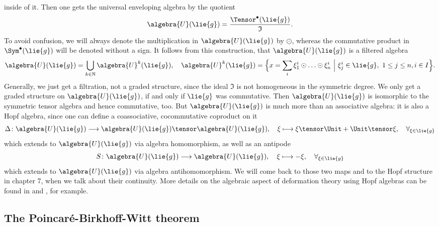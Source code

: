 inside of it. Then one gets the universal enveloping algebra by the 
quotient
\begin{equation}
	\label{Alg:UnivEnvAlg}
	\algebra{U}(\lie{g})
	=
	\frac{\Tensor^{\bullet}(\lie{g})}{\mathfrak{I}}.
\end{equation}
To avoid confusion, we will always denote the multiplication in 
$\algebra{U}(\lie{g})$ by $\odot$, whereas the commutative product in 
$\Sym^{\bullet}(\lie{g})$ will be denoted without a sign.
It follows from this construction, that $\algebra{U}(\lie{g})$ is a 
filtered algebra
\begin{equation*}
	\algebra{U}(\lie{g})
	=
	\bigcup_{k \in \mathbb{N}}
	\algebra{U}^k(\lie{g})
	, \quad
	\algebra{U}^k(\lie{g})
	= 
	\Big\lbrace
		x 
		= 
		\sum_i
		\xi_1^i \odot \ldots \odot \xi_n^i
	\ \Big| \ 
		\xi_j^i \in \lie{g}
		, \
		1 \leq j \leq n,
		i \in I
	\Big\rbrace.
\end{equation*}
Generally, we just get a filtration, not a graded structure, since the 
ideal $\mathfrak{I}$ is not homogeneous in the symmetric degree. We only 
get a graded structure on $\algebra{U}(\lie{g})$, if and only if $\lie{g}$ 
was commutative. Then $\algebra{U}(\lie{g})$ is isomorphic to the symmetric
tensor algebra and hence commutative, too. But $\algebra{U}(\lie{g})$
is much more than an associative algebra: it is also a Hopf algebra, 
since one can define a coassociative, cocommutative coproduct on it
\begin{equation*}
	\Delta \colon
	\algebra{U}(\lie{g})
	\longrightarrow
	\algebra{U}(\lie{g})
	\tensor
	\algebra{U}(\lie{g})
	, \quad
	\xi
	\longmapsto
	\xi \tensor \Unit
	+
	\Unit \tensor \xi
	, \quad
	\forall_{\xi \in \lie{g}}
\end{equation*} 
which extends to $\algebra{U}(\lie{g})$ via algebra homomorphism, 
as well as an antipode
\begin{equation*}
	S \colon
	\algebra{U}(\lie{g})
	\longrightarrow
	\algebra{U}(\lie{g})
	, \quad
	\xi
	\longmapsto
	- \xi
	, \quad
	\forall_{\xi \in \lie{g}}
\end{equation*}
which extends to $\algebra{U}(\lie{g})$ via algebra antihomomorphism.
We will come back to those two maps and to the Hopf structure in chapter 7,
when we talk about their continuity. More details on the algebraic
aspect of deformation theory using Hopf algebras can be found in 
\cite{chari.pressley:1994a} and \cite{majid:1995a}, for example.





\subsection{The Poincar\'e-Birkhoff-Witt theorem}
\label{subsec:chap3_PoincareBirkhoffWitt}

